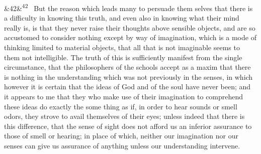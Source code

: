\documentclass[12pt]{article}
\newcommand{\para}[1][]{\par\noindent\ifx&#1&\else\textsuperscript{\footnotesize #1}~\fi}
\begin{document}
\para[42] But the reason which leads many to persuade them selves that there is a difficulty in knowing this truth, and even also in knowing what their mind really is, is that they never raise their thoughts above sensible objects, and are so accustomed to consider nothing except by way of imagination, which is a mode of thinking limited to material objects, that all that is not imaginable seems to them not intelligible. The truth of this is sufficiently manifest from the single circumstance, that the philosophers of the schools accept as a maxim that there is nothing in the understanding which was not previously in the senses, in which however it is certain that the ideas of God and of the soul have never been; and it appears to me that they who make use of their imagination to comprehend these ideas do exactly the some thing as if, in order to hear sounds or smell odors, they strove to avail themselves of their eyes; unless indeed that there is this difference, that the sense of sight does not afford us an inferior assurance to those of smell or hearing; in place of which, neither our imagination nor our senses can give us assurance of anything unless our understanding intervene.
\end{document}
